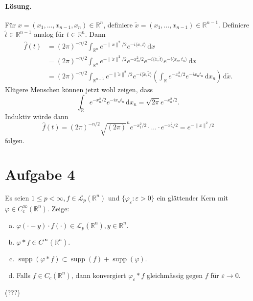 \documentclass[10pt]{article}\usepackage[]{graphicx}\usepackage[]{color}
\newcommand{\R}{\mathbb{R}}
\newcommand{\df}{\,\textrm{d}}
\DeclareMathOperator*{\supp}{supp}
\begin{document}
\paragraph{Lösung.}
Für $x = (x_1, \dots, x_{n-1}, x_n) \in \R^n$,
definiere $\widetilde{x} = (x_1, \dots, x_{n-1}) \in \R^{n-1}$.
Definiere $\widetilde{t} \in \R^{n-1}$ analog für $t \in \R^n$.
Dann
\begin{align*}
  \widehat{f}(t)
  &= (2\pi)^{-n/2} \int_{\R^n} e^{-\|x\|^2/2} e^{-i\langle x, t \rangle} \df x \\
  &= (2\pi)^{-n/2} \int_{\R^n} e^{-\|\widetilde{x}\|^2/2}e^{-x_n^2/2} e^{-i\langle \widetilde{x}, \widetilde{t} \rangle}e^{-i\langle x_n, t_n \rangle} \df x \\
  &= (2\pi)^{-n/2} \int_{\R^{n-1}} e^{-\|\widetilde{x}\|^2/2}e^{-i\langle \widetilde{x}, \widetilde{t} \rangle} \left(\int_{\R} e^{-x_n^2/2} e^{-i x_n t_n} \df x_n \right) \df \widetilde{x}.
\end{align*}
Klügere Menschen können jetzt wohl zeigen, dass
\[
  \int_{\R} e^{-x_n^2/2} e^{-i x_n t_n} \df x_n = \sqrt{2\pi} e^{-x_n^2/2}.
\]
Induktiv würde dann
\[
 \widehat{f}(t) = (2\pi)^{-n/2} \sqrt{(2\pi)}^n e^{-x_1^2/2} \cdot \dots \cdot e^{-x_n^2/2} = e^{-\|x\|^2/2}
\]
folgen.

\section*{Aufgabe 4}
Es seien $1 \leq p < \infty, f \in \mathscr{L}_p(\R^n)$
und $\{\varphi_\varepsilon: \varepsilon > 0\}$
ein glättender Kern mit $\varphi \in C_c^{\infty}(\R^n)$.
Zeige:
\begin{enumerate}[(a)]
  \item $\varphi(\cdot - y) \cdot f(\cdot) \in \mathscr{L}_p(\R^n), y \in \R^n$.


  \item $\varphi * f \in C^{\infty}(\R^n)$.

  
  \item $\supp(\varphi * f) \subset \supp(f) + \supp(\varphi)$.

  \item Falls $f \in C_c(\R^n)$, dann konvergiert $\varphi_\varepsilon * f$ gleichmässig gegen $f$ für $\varepsilon \to 0$.

\end{enumerate}

(???)
\end{document}
